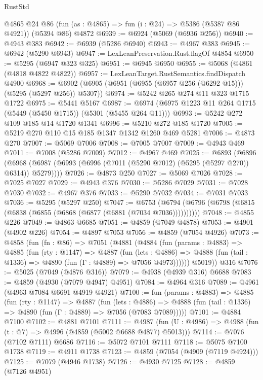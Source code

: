 \begin{lexlean}{RustStd}
\begin{coremodule}
    @4865
    @24
    @86
    (fun (as : @4865) => fun (i : @24) => @5386 (@5387 @86 @4921))
    (@5394 @86)
    @4872
@6939 := @6924 (@5069 (@6936 @256))
@6940 := @4943 @383
@6942 := @6939 (@5286 @6940)
@6943 := @4967 @383
@6945 := @6942 (@5290 @6943)
@6947 := LexLeanPreservation.Rust.flagOf @4854
@6950 := @5295 (@6947 @323 @325)
@6951 := @6945 @6950
@6955 := @5068 (@4861 (@4818 @4822 @4822))
@6957 := LexLeanTarget.RustSemantics.findDispatch @4900
@6968 := @6902 (@6905 (@6951 (@6955 (@6957 @256 (@6292 @15))) (@5295 (@5297 @256)) @5307))
@6974 := @5242 @265 @274 @11 @323 @1715 @1722
@6975 := @5441 @5167
@6987 := @6974 (@6975 @1223 @11 @264 @1715 (@5449 (@5450 @1715)) (@5301 (@5455 @264 @11)))
@6993 := @5242 @272 @109 @185 @14 @1720 @1341
@6996 := @5210 @272 @185 @1720
@7005 := @5219 @270 @110 @15 @185 @1347 @1342 @1260 @469 @5281
@7006 := @4873 @270
@7007 := @5069 @7006
@7008 := @7005 @7007
@7009 := @4943 @469
@7011 := @7008 (@5286 @7009)
@7012 := @4967 @469
@7025 := @6893
    (@6896 (@6968 (@6987 (@6993 (@6996 (@7011 (@5290 @7012) (@5295 (@5297 @270)) @6314)) @5279))))
@7026 := @4873 @250
@7027 := @5069 @7026
@7028 := @7025 @7027
@7029 := @4943 @376
@7030 := @5286 @7029
@7031 := @7028 @7030
@7032 := @4967 @376
@7033 := @5290 @7032
@7034 := @7031 @7033
@7036 := @5295 (@5297 @250)
@7047 := @6753 (@6794 (@6796 (@6798 (@6815 (@6838 (@6855 (@6868 (@6877 (@6881 (@7034 @7036))))))))))
@7048 := @4855 @226
@7049 := @4863 @6685
@7051 := @4859 (@7049 @4878)
@7053 := @4901 (@4902 @226)
@7054 := @4897 @7053
@7056 := @4859 (@7054 @4926)
@7073 := @4858
    (fun (fn : @86) =>
    @7051
      (@4881
        (@4884
          (fun (params : @4883) =>
          @4885
            (fun (rty : @1147) =>
            @4887
              (fun (lets : @4886) =>
              @4888 (fun (tail : @1336) => @4890 (fun (Γ : @4889) => @7056 @4973))))))
        @5019))
    @316
@7076 := @5025 (@7049 (@4876 @316))
@7079 := @4938 (@4939 @316) @6688
@7083 := @4859 (@4930 (@7079 @4947) @4951)
@7084 := @4964 @316
@7089 := @4961 (@4963 @7084 @6691 @4919 @4921)
@7100 := fun (params : @4883) =>
  @4885
    (fun (rty : @1147) =>
    @4887
      (fun (lets : @4886) =>
      @4888 (fun (tail : @1336) => @4890 (fun (Γ : @4889) => @7056 (@7083 @7089)))))
@7101 := @4884 @7100
@7102 := @4881 @7101
@7111 := @4987 (fun (U : @4986) => @4988 (fun (t : @7) => @4996 (@4859 (@5002 @6688 @4877) @5013)))
@7114 := @7076 (@7102 @7111) @6686
@7116 := @5072 @7101 @7111
@7118 := @5075 @7100 @1738
@7119 := @4911 @1738
@7123 := @4859 (@7054 (@4909 (@7119 @4924)))
@7125 := @7079 (@4946 @1738)
@7126 := @4930 @7125
@7128 := @4859 (@7126 @4951)

\end{coremodule}
\end{lexlean}
